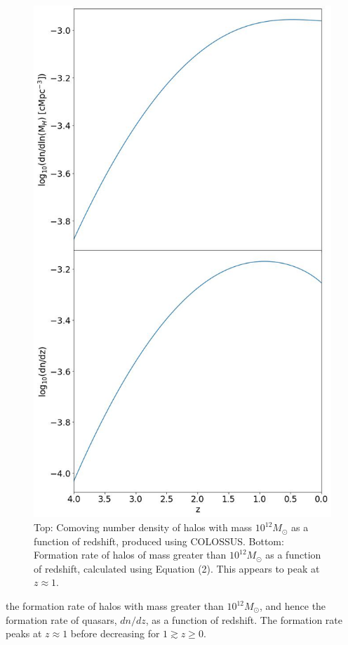 \documentclass[12pt, twocolumn]{article}%
\begin{document}
\begin{figure}[H]
\centering
\includegraphics[width=12.5cm]{Plot_6.jpeg}
\caption{Top: Comoving number density of halos with mass $10^{12}M_\odot$ as a function of redshift, produced using COLOSSUS. Bottom: Formation rate of halos of mass greater than $10^{12}M_\odot$ as a function of redshift, calculated using Equation (2). This appears to peak at $z\approx1$.}
\label{fig:6}
\end{figure}
\newpage
\twocolumngrid


\noindent the formation rate of halos with mass greater than $10^{12}M_\odot$, and hence the formation rate of quasars, $dn/dz$, as a function of redshift. The formation rate peaks at $z\approx1$ before decreasing for $1 \gtrsim z \geq 0$.
\end{document}
